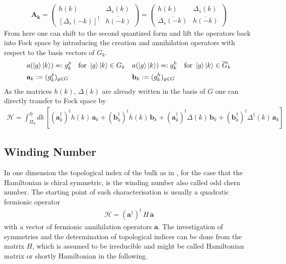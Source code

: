 \begin{align}\label{eq:Fourier Hamiltonian}
    \mathbf{A_k} = \begin{pmatrix}
        {h}(k) & {\Delta}_s(k)\\
        [{\Delta}_s(-k)]^\dagger& \overline{{h}(-k)}
    \end{pmatrix}= \begin{pmatrix}
        {h}(k) & {\Delta}_s(k)\\
        \overline{{\Delta}_s(-k)}& \overline{{h}(-k)}
    \end{pmatrix}
\end{align}
From here one can shift to the second quantized form and lift the operators back into Fock space by introducing the creation and annihilation operators with respect to the basis vectors of $G_k$.
\begin{align*}
    &a(\ket{g}\ket{k})=:g_k^p\quad \text{for } \ket{g}\ket{k}\in G_k&&a(\ket{g}\ket{k})=:g_k^h\quad \text{for } \ket{g}\ket{k}\in \overline{G}_k\\
    &\mathbf{a}_k:=(g_k^p)_{g\in G}&&\mathbf{b}_k:=(g_k^h)_{g\in G}
\end{align*}
As the matrices $h(k)$, $\Delta(k)$ are already written in the basis of $G$ one can directly transfer to Fock space by
\begin{align*}
    \mathcal{H}=\int_{\Pi_d}^\oplus dk\,\left[ (\mathbf{a}_k^\dagger)^t h(k)\, \mathbf{a}_k + (\mathbf{b}_k^\dagger)^t \overline{h}(k)\, \mathbf{b}_k + (\mathbf{a}_k^\dagger)^t \Delta(k)\,\mathbf{b}_k + (\mathbf{b}_k^\dagger)^t \Delta^\dagger(k)\, \mathbf{a}_k \right]
\end{align*}









\subsection{Winding Number}\label{sec:winding number}
In one dimension the topological index of the bulk as in , for the case that the Hamiltonian is chiral symmetric, is the winding number also called odd chern number. The starting point of such characterisation is usually a quadratic fermionic operator \cite{ryuTopologicalInsulatorsSuperconductors2010}
\begin{align*}
    \mathcal{H}=(\mathbf{a}^\dagger)^t \,H\,\mathbf{a}
\end{align*}
with a vector of fermionic annihilation operators $\mathbf{a}$. The investigation of symmetries and the determination of topological indices can be done from the matrix $H$, which is assumed to be irreducible and might be called Hamiltonian matrix or shortly Hamiltonian in the following.
